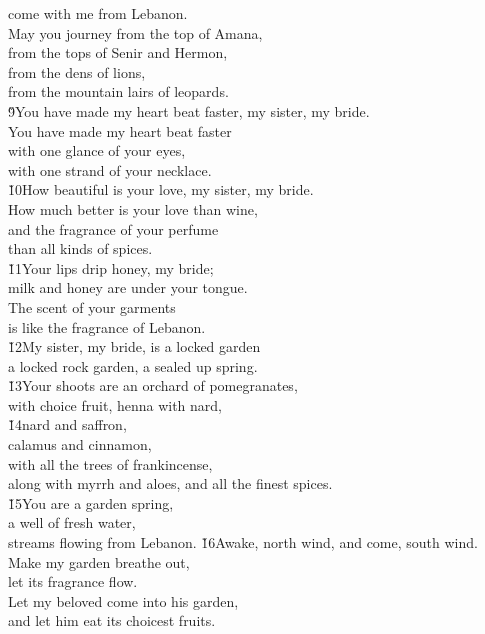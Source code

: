 \begin{poetry}
\poemll    come with me from Lebanon. \\
\poeml May you journey from the top of Amana, \\
\poemll    from the tops of Senir and Hermon, \\
\poeml from the dens of lions, \\
\poemll    from the mountain lairs of leopards. \\
\poeml \v{9}You have made my heart beat faster, my sister, my bride. \\
\poemll    You have made my heart beat faster \\
\poemlll       with one glance of your eyes, \\
\poemll    with one strand of your necklace. \\
\poeml \v{10}How beautiful is your love, my sister, my bride. \\
\poemll    How much better is your love than wine, \\
\poeml and the fragrance of your perfume \\
\poemll    than all kinds of spices. \\
\poeml \v{11}Your lips drip honey, my bride; \\
\poemll    milk and honey are under your tongue. \\
\poeml The scent of your garments \\
\poemll    is like the fragrance of Lebanon. \\
\poeml \v{12}My sister, my bride, is a locked garden \\
\poemll    a locked rock garden, a sealed up spring. \\
\poeml \v{13}Your shoots are an orchard of pomegranates, \\
\poemll    with choice fruit, henna with nard, \\
\poeml \v{14}nard and saffron, \\
\poemll    calamus and cinnamon, \\
\poeml with all the trees of frankincense, \\
\poemll    along with myrrh and aloes, and all the finest spices. \\
\poeml \v{15}You are a garden spring, \\
\poemll    a well of fresh water, \\
\poemlll       streams flowing from Lebanon.
\poeml \v{16}Awake, north wind, and come, south wind. \\
\poemll    Make my garden breathe out, \\
\poemlll       let its fragrance flow. \\
\poeml Let my beloved come into his garden, \\
\poemll    and let him eat its choicest fruits.
\end{poetry}

